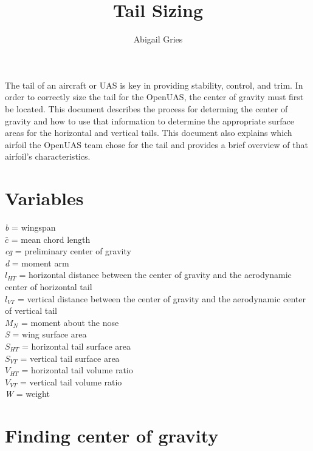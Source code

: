 \documentclass{article}
\begin{document}
\title{\textbf{Tail Sizing}}
\author{Abigail Gries}
\maketitle

The tail of an aircraft or UAS is key in providing stability, control, and trim. In order to correctly size the tail for the OpenUAS, the center of gravity must first be located. This document describes the process for determing the center of gravity and how to use that information to determine the appropriate surface areas for the horizontal and vertical tails. This document also explains which airfoil the OpenUAS team chose for the tail and provides a brief overview of that airfoil's characteristics. 

\section*{Variables}
\textit{b} = wingspan \\
$\bar{c}$ = mean chord length \\
\textit{cg} = preliminary center of gravity \\
\textit{d} = moment arm \\
$l_{HT}$ = horizontal distance between the center of gravity and the aerodynamic center of horizontal tail \\
$l_{VT}$ = vertical distance between the center of gravity and the aerodynamic center of vertical tail \\
$M_N$ = moment about the nose \\
\textit{S} = wing surface area \\
$S_{HT}$ = horizontal tail surface area \\
$S_{VT}$ = vertical tail surface area \\
$V_{HT}$ = horizontal tail volume ratio\\
$V_{VT}$ = vertical tail volume ratio \\
\textit{W} = weight \\

\section*{Finding center of gravity}
\end{document}
